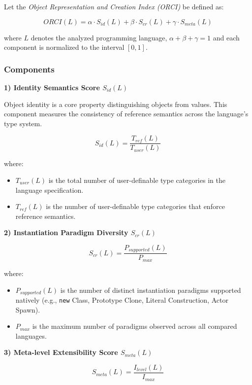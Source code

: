 Let the \textit{Object Representation and Creation Index (ORCI)} be defined as:

\[
    ORCI(L) = 
    \alpha \cdot S_{id}(L) + 
    \beta \cdot S_{cr}(L) + 
    \gamma \cdot S_{meta}(L)
\]

where $L$ denotes the analyzed programming language, $\alpha + \beta + \gamma = 1$ and each component is normalized to the interval $[0,1]$.

\subsubsection{Components}

\textbf{1) Identity Semantics Score $S_{id}(L)$}

Object identity is a core property distinguishing objects from values. This component measures the consistency of reference semantics across the language's type system.

\[
S_{id}(L) = \frac{T_{ref}(L)}{T_{user}(L)}
\]

where:
\begin{itemize}
    \item $T_{user}(L)$ is the total number of user-definable type categories in the language specification.
    \item $T_{ref}(L)$ is the number of user-definable type categories that enforce reference semantics.
\end{itemize}

\textbf{2) Instantiation Paradigm Diversity $S_{cr}(L)$}

\[
S_{cr}(L) = \frac{P_{supported}(L)}{P_{max}}
\]

where:
\begin{itemize}
    \item $P_{supported}(L)$ is the number of distinct instantiation paradigms supported natively (e.g., \texttt{new} Class, Prototype Clone, Literal Construction, Actor Spawn).
    \item $P_{max}$ is the maximum number of paradigms observed across all compared languages.
\end{itemize}

\textbf{3) Meta-level Extensibility Score $S_{meta}(L)$}

\[
S_{meta}(L) = \frac{I_{level}(L)}{I_{max}}
\]

